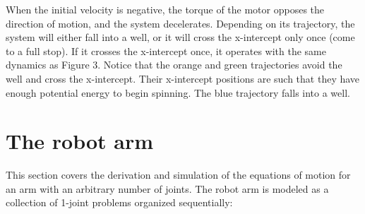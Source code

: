 \documentclass{article}
\begin{document}
\newpage
\centering When the initial velocity is negative, the torque of the motor opposes the direction of motion, and the system decelerates. Depending on its trajectory, the system will either fall into a well, or it will cross the x-intercept only once (come to a full stop). If it crosses the x-intercept once, it operates with the same dynamics as Figure 3. Notice that the orange and green trajectories avoid the well and cross the x-intercept. Their x-intercept positions are such that they have enough potential energy to begin spinning. The blue trajectory falls into a well. 

\begin{center}
%
\label{labelname}%
\end{center}

\section{The robot arm}
\centering This section covers the derivation and simulation of the equations of motion for an arm with an arbitrary number of joints. The robot arm is modeled as a collection of 1-joint problems organized sequentially:

\vspace{24pt}
\end{document}
